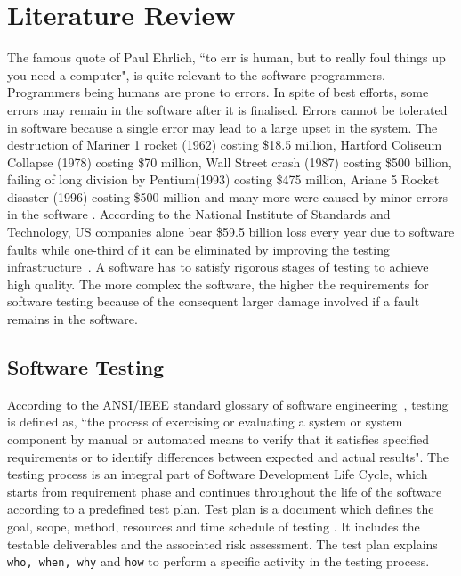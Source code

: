 
\chapter{Literature Review}
\label{chap:softwareTesting}

The famous quote of Paul Ehrlich, ``to err is human, but to really foul things up you need a computer", is quite relevant to the software programmers. Programmers being humans are prone to errors. In spite of best efforts, some errors may remain in the software after it is finalised.  Errors cannot be tolerated in software because a single error may lead to a large upset in the system. The destruction of Mariner 1 rocket (1962) costing \$18.5 million, Hartford Coliseum Collapse (1978) costing \$70 million, Wall Street crash (1987) costing \$500 billion, failing of long division by Pentium\texttrademark (1993) costing \$475 million, Ariane 5 Rocket disaster (1996) costing \$500 million and many more were caused by minor errors in the software \cite{garfinkel2005history}. According to the National Institute of Standards and Technology, US companies alone bear \$59.5 billion loss every year due to software faults while one-third of it can be eliminated by improving the testing infrastructure~\cite{tassey2002economic}. A software has to satisfy rigorous stages of testing to achieve high quality. The more complex the software, the higher the requirements for software testing because of the consequent larger damage involved if a fault remains in the software.

\section{Software Testing} \label{sec:softwareTesting}
According to the ANSI/IEEE standard glossary of software engineering~\cite{american1984}, testing is defined as, ``the process of exercising or evaluating a system or system component by manual or automated means to verify that it satisfies specified requirements or to identify differences between expected and actual results". The testing process is an integral part of Software Development Life Cycle, which starts from requirement phase and continues throughout the life of the software according to a predefined test plan. Test plan is a document which defines the goal, scope, method, resources and time schedule of testing \cite{futrell2001quality}. It includes the testable deliverables and the associated risk assessment. The test plan explains \verb+who, when, why+ and \verb+how+ to perform a specific activity in the testing process. 

